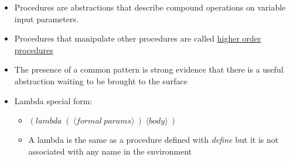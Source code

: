\documentclass{article}
\begin{document}
\begin{itemize}
  \noindent{}

  \noindent{}

\item Procedures are abstractions that describe compound operations on variable input parameters.
\item Procedures that manipulate other procedures are called \underline{higher order procedures}
\item The presence of a common pattern is strong evidence that there is a useful abstraction waiting to be brought to the surface
\item Lambda special form:
  \begin{itemize}
  \item $(lambda\; (\:\langle formal\: params \rangle\:)\; \langle body \rangle\:)$
  \item A lambda is the same as a procedure defined with \emph{define} but it is not associated with any name in the environment
  \end{itemize}


\end{itemize}
\end{document}
